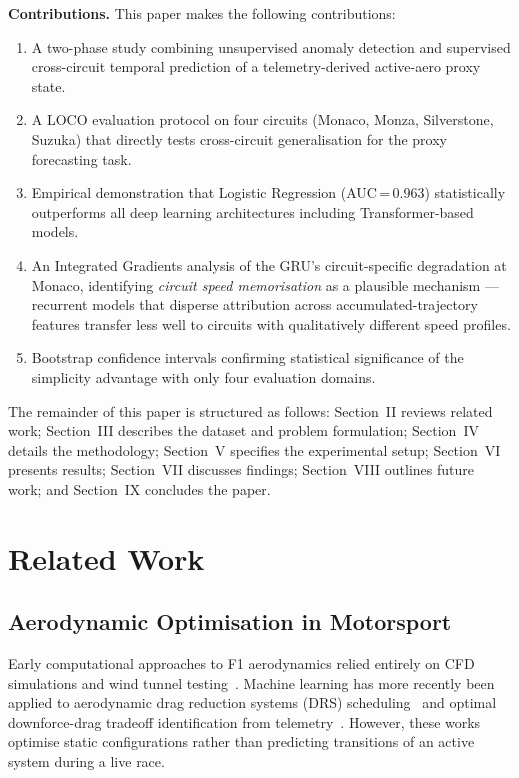 \documentclass[conference,a4paper]{IEEEtran}
\begin{document}
\textbf{Contributions.}
This paper makes the following contributions:
\begin{enumerate}
  \item A two-phase study combining unsupervised anomaly detection and supervised
        cross-circuit temporal prediction of a telemetry-derived active-aero proxy state.
  \item A LOCO evaluation protocol on four circuits (Monaco, Monza, Silverstone,
        Suzuka) that directly tests cross-circuit generalisation for the proxy
        forecasting task.
  \item Empirical demonstration that Logistic Regression (AUC\,=\,0.963) statistically
        outperforms all deep learning architectures including Transformer-based models.
  \item An Integrated Gradients analysis of the GRU's circuit-specific degradation at
        Monaco, identifying \emph{circuit speed memorisation} as a plausible mechanism
        — recurrent models that disperse attribution across accumulated-trajectory
        features transfer less well to circuits with qualitatively different speed profiles.
  \item Bootstrap confidence intervals confirming statistical significance of the
        simplicity advantage with only four evaluation domains.
\end{enumerate}

The remainder of this paper is structured as follows: Section~II reviews related work;
Section~III describes the dataset and problem formulation; Section~IV details the
methodology; Section~V specifies the experimental setup; Section~VI presents results;
Section~VII discusses findings; Section~VIII outlines future work; and Section~IX
concludes the paper.

\section{Related Work}

\subsection{Aerodynamic Optimisation in Motorsport}

Early computational approaches to F1 aerodynamics relied entirely on CFD simulations
and wind tunnel testing~\cite{ref_cfd}.
Machine learning has more recently been applied to aerodynamic drag reduction systems
(DRS) scheduling~\cite{ref_drs} and optimal downforce-drag tradeoff identification
from telemetry~\cite{ref_aero_opt}.
However, these works optimise static configurations rather than predicting transitions
of an active system during a live race.
\end{document}
